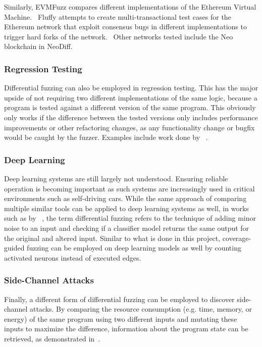 \documentclass{article}
\let\savedCite=\cite
\renewcommand{\cite}{\unskip~\savedCite}
\begin{document}
\begin{multicols}{2}
    Similarly, EVMFuzz compares different implementations of the Ethereum Virtual Machine.\cite{EVMFuzz} Fluffy attempts to create multi-transactional test cases for the Ethereum network that exploit consensus bugs in different implementations to trigger hard forks of the network.\cite{Fluffy} Other networks tested include the Neo blockchain in NeoDiff.\cite{NeoDiff}

    \subsubsection{Regression Testing}

    Differential fuzzing can also be employed in regression testing. This has the major upside of not requiring two different implementations of the same logic, because a program is tested against a different version of the same program. This obviously only works if the difference between the tested versions only includes performance improvements or other refactoring changes, as any functionality change or bugfix would be caught by the fuzzer. Examples include work done by \citeauthor{HyDiff}\cite{HyDiff}.

    \subsubsection{Deep Learning}

    Deep learning systems are still largely not understood. Ensuring reliable operation is becoming important as such systems are increasingly used in critical environments such as self-driving cars. While the same approach of comparing multiple similar tools can be applied to deep learning systems as well, in works such as by \citeauthor{DLFuzz}\cite{DLFuzz}, the term differential fuzzing refers to the technique of adding minor noise to an input and checking if a classifier model returns the same output for the original and altered input. Similar to what is done in this project, coverage-guided fuzzing can be employed on deep learning models as well by counting activated neurons instead of executed edges.

    \subsubsection{Side-Channel Attacks}

    Finally, a different form of differential fuzzing can be employed to discover side-channel attacks. By comparing the resource consumption (e.g. time, memory, or energy) of the same program using two different inputs and mutating these inputs to maximize the difference, information about the program state can be retrieved, as demonstrated in\cite{DifFuzz}.


\end{multicols}
\end{document}
